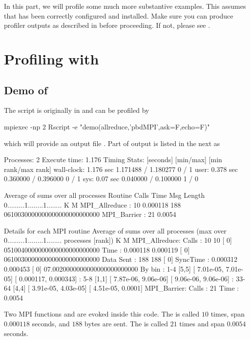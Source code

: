 In this part, we will profile some much more substantive examples.  This assumes that  has been correctly configured and installed.  Make sure you can produce profiler outputs as described in  before proceeding.  If not, please see \instdebug.


\section{Profiling with }
\label{sec:ex_fpmpi}


\subsection{Demo of }

The  script is originally in  and can be
profiled by
\begin{Code}
mpiexec -np 2 Rscript -e "demo(allreduce,'pbdMPI',ask=F,echo=F)"
\end{Code}
which will provide an output file .
Part of output is listed in the next as
\begin{Output}
Processes:      2
Execute time:   1.176
Timing Stats: [seconds] [min/max]       [min rank/max rank]
wall-clock: 1.176 sec 1.171488 / 1.180277     0 / 1
user: 0.378 sec 0.360000 / 0.396000     0 / 1
sys: 0.07 sec  0.040000 / 0.100000     1 / 0

Average of sums over all processes
Routine                 Calls       Time Msg Length    %
0.........1........1........
K        M
MPI_Allreduce       :      10   0.000118        188 0610030000000000000000000000
MPI_Barrier         :      21     0.0054        

Details for each MPI routine
Average of sums over all processes
(max over          0.........1........1........
 processes [rank])           K        M
MPI_Allreduce:
Calls     :         10           10 [   0] 0510040000000000000000000000
Time      :   0.000118     0.000119 [   0] 0610030000000000000000000000
Data Sent :        188          188 [   0]
SyncTime  :   0.000312     0.000453 [   0] 07.0020000000000000000000000
By bin    : 1-4 [5,5]   [  7.01e-05,  7.01e-05] [  0.000117,  0.000343]
: 5-8 [1,1]   [  7.87e-06,  9.06e-06] [  9.06e-06,  9.06e-06]
: 33-64       [4,4]   [  3.91e-05,  4.03e-05] [  4.51e-05,    0.0001]
MPI_Barrier:
Calls     :         21
Time      :     0.0054
\end{Output}
Two MPI  functions  and  are
evoked inside this  code. The  is called $10$
times, span $0.000118$ seconds, and $188$ bytes are sent.
The  is called $21$ times and span $0.0054$ seconds.


